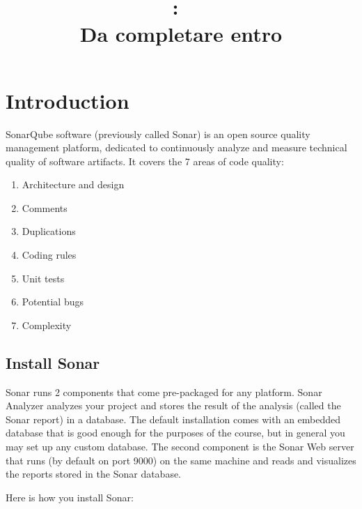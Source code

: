 \documentclass{article}
\title{
\vspace{2in}
\textmd{\textbf{\hmwkClass:\ \hmwkTitle}}\\
\normalsize\vspace{0.1in}\small{Da completare entro \hmwkDueDate}\\
\vspace{0.1in}\large{\textit{\hmwkClassInstructor}}
\vspace{3in}
}
\author{\textbf{\hmwkAuthorName}}
\date{} %
\begin{document}
\maketitle



\newpage
\tableofcontents
\newpage



\section{Introduction}


SonarQube software (previously called Sonar) is an open source quality 
management platform, dedicated to continuously analyze and measure 
technical quality of software artifacts.
It covers the 7 areas of code quality:

\begin{enumerate}
\item Architecture and design
\item Comments
\item Duplications
\item Coding rules
\item Unit tests
\item Potential bugs
\item Complexity
\end{enumerate}




\subsection{Install Sonar}

Sonar runs 2 components that come pre-packaged for any platform. Sonar
Analyzer analyzes your project and stores the result of the analysis
(called the Sonar report) in a database. The default installation comes with an embedded
database that is good enough for the purposes of the course, but in
general you may set up any custom database. The second component is
the Sonar Web server that runs (by default on port 9000) on the same
machine and reads and visualizes the reports stored in the Sonar database.

Here is how you install Sonar:
\end{document}
